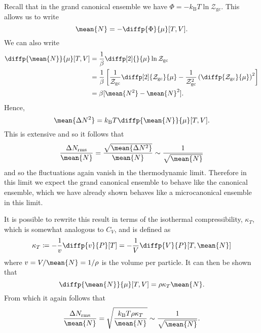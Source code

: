 \documentclass[fleqn]{NotesClass}
\newcommand*{\boltzmann}{k_{\mathrm{B}}}
\newcommand*{\gcpartition}{\mathcal{Z}_{\mathrm{gc}}}
\begin{document}
    Recall that in the grand canonical ensemble we have \(\Phi = -\boltzmann T\ln\gcpartition\).
    This allows us to write
    \begin{equation}
        \mean{N} = -\diffp{\Phi}{\mu}[T, V].
    \end{equation}
    We can also write
    \begin{align}
        \diffp{\smash{\mean{N}}}{\mu}[T,V] &= \frac{1}{\beta} \diffp[2]{}{\mu}\ln\gcpartition\\
        &= \frac{1}{\beta} \left[ \frac{1}{\gcpartition}\diffp[2]{\gcpartition}{\mu} - \frac{1}{\gcpartition^2}\left( \diffp{\gcpartition}{\mu} \right)^2 \right]\\
        &= \beta[\mean{N^2} - \mean{N}^2].
    \end{align}
    Hence,
    \begin{equation}
        \mean{\Delta N^2} = \boltzmann T \diffp{\smash{\mean{N}}}{\mu}[T,V].
    \end{equation}
    This is extensive and so it follows that
    \begin{equation}
        \frac{\Delta N_{\mathrm{rms}}}{\mean{N}} = \frac{\sqrt{\mean{\Delta N^2}}}{\mean{N}} \sim \frac{1}{\sqrt{\mean{N}}}
    \end{equation}
    and so the fluctuations again vanish in the thermodynamic limit.
    Therefore in this limit we expect the grand canonical ensemble to behave like the canonical ensemble, which we have already shown behaves like a microcanonical ensemble in this limit.
    
    It is possible to rewrite this result in terms of the isothermal compressibility, \(\kappa_T\), which is somewhat analogous to \(C_V\), and is defined as
    \begin{equation}
        \kappa_T \coloneqq -\frac{1}{v} \diffp{v}{P}[T] = -\frac{1}{V}\diffp{V}{P}[T, \mean{N}]
    \end{equation}
    where \(v = V/\mean{N} = 1/\rho\) is the volume per particle.
    It can then be shown that
    \begin{equation}
        \diffp{\mean{N}}{\mu}[T,V] = \rho \kappa_T \mean{N}.
    \end{equation}
    From which it again follows that
    \begin{equation}
        \frac{\Delta N_{\mathrm{rms}}}{\mean{N}} = \sqrt{\frac{\boltzmann T \rho \kappa_T}{\mean{N}}} \sim \frac{1}{\sqrt{\mean{N}}}.
    \end{equation}
    
\end{document}
